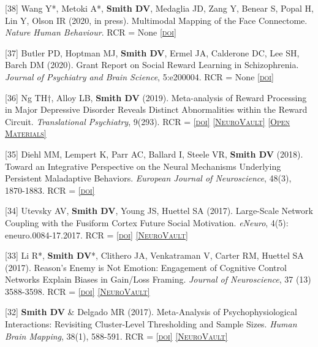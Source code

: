\documentclass[11pt, letterpaper]{article}
\newcommand{\doi}[1]{\href{#1}{\scriptsize\textsc{[doi]}}} %
\newcommand{\neurovault}[1]{\href{#1}{\scriptsize\textsc{[NeuroVault]}}}
\newcommand{\materials}[1]{\href{#1}{\scriptsize\textsc{[Open Materials]}}}
\begin{document}
\begin{hangparas}{.5in}{1}

[38] Wang Y*, Metoki A*, \textbf{Smith DV}, Medaglia JD, Zang Y, Benear S, Popal H, Lin Y, Olson IR (2020, in press). Multimodal Mapping of the Face Connectome. \textit{Nature Human Behaviour}. RCR = None \doi{https://doi.org/10.1038/s41562-019-0811-3}


[37] Butler PD, Hoptman MJ, \textbf{Smith DV}, Ermel JA, Calderone DC, Lee SH, Barch DM (2020). Grant Report on Social Reward Learning in Schizophrenia. \textit{Journal of Psychiatry and Brain Science}, 5:e200004. RCR = None \doi{https://doi.org/10.20900/jpbs.20200004}

[36] Ng TH†, Alloy LB, \textbf{Smith DV} (2019). Meta-analysis of Reward Processing in Major Depressive Disorder Reveals Distinct Abnormalities within the Reward Circuit. \textit{Translational Psychiatry}, 9(293). RCR =  \doi{https://doi.org/10.1038/s41398-019-0644-x} \neurovault{https://neurovault.org/collections/3884/} \materials{https://osf.io/sjb4d}

[35] Diehl MM, Lempert K, Parr AC, Ballard I, Steele VR, \textbf{Smith DV} (2018). Toward an Integrative Perspective on the Neural Mechanisms Underlying Persistent Maladaptive Behaviors. \textit{European Journal of Neuroscience}, 48(3), 1870-1883. RCR =  \doi{https://doi.org/10.1111/ejn.14083}

[34] Utevsky AV, \textbf{Smith DV}, Young JS, Huettel SA (2017). Large-Scale Network Coupling with the Fusiform Cortex Future Social Motivation. \textit{eNeuro}, 4(5): eneuro.0084-17.2017. RCR =  \doi{https://doi.org/10.1523/ENEURO.0084-17.2017} \neurovault{https://neurovault.org/collections/4804/}

[33] Li R*, \textbf{Smith DV}*, Clithero JA, Venkatraman V, Carter RM, Huettel SA (2017). Reason’s Enemy is Not Emotion: Engagement of Cognitive Control Networks Explain Biases in Gain/Loss Framing. \textit{Journal of Neuroscience}, 37 (13) 3588-3598. RCR =  \doi{https://doi.org/10.1523/JNEUROSCI.3486-16.2017} \neurovault{http://neurovault.org/collections/1484/}

[32] \textbf{Smith DV} \& Delgado MR (2017). Meta-Analysis of Psychophysiological Interactions: Revisiting Cluster-Level Thresholding and Sample Sizes. \textit{Human Brain Mapping}, 38(1), 588-591. RCR =  \doi{https://doi.org/10.1002/hbm.23354} \neurovault{https://neurovault.org/collections/1406/}


\end{hangparas}
\end{document}
